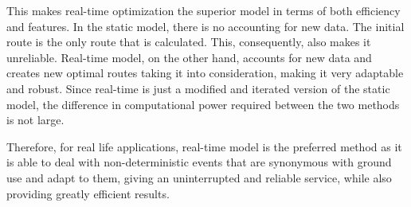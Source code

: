 \documentclass[12pt]{article}
\begin{document}
This makes real-time optimization the superior model in terms of both efficiency and features. In the static model, there is no accounting for new data. The initial route is the only route that is calculated. This, consequently, also makes it unreliable. Real-time model, on the other hand, accounts for new data and creates new optimal routes taking it into consideration, making it very adaptable and robust. Since real-time is just a modified and iterated version of the static model, the difference in computational power required between the two methods is not large. 

Therefore, for real life applications, real-time model is the preferred method as it is able to deal with non-deterministic events that are synonymous with ground use and adapt to them, giving an uninterrupted and reliable service, while also providing greatly efficient results.


 

\end{document}

